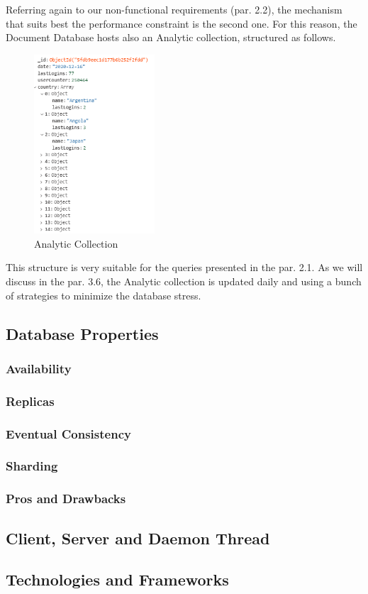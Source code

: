 Referring again to our non-functional requirements (par. 2.2), the mechanism that suits best the performance constraint is the second one. 
For this reason, the Document Database hosts also an Analytic collection, structured as follows.
\begin{figure}[H]
	\centering
	\includegraphics[width= 0.4\textwidth]{img/analytic_collection.png}
	\caption{Analytic Collection}
\end{figure}

This structure is very suitable for the queries presented in the par. 2.1. 
As we will discuss in the par. 3.6, the Analytic collection is updated daily and using a bunch of strategies to minimize the database stress.


\subsection{Database Properties}
\subsubsection{Availability}
\subsubsection{Replicas}
\subsubsection{Eventual Consistency}
\subsubsection{Sharding}
\subsubsection{Pros and Drawbacks}


\subsection{Client, Server and Daemon Thread}

\subsection{Technologies and Frameworks}

